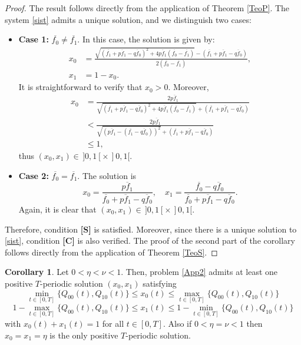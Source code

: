 \documentclass[11pt,reqno]{amsart}
\theoremstyle{definition}
\newtheorem{Corollary}{Corollary}
\begin{document}
\begin{proof}
The result follows directly from the application of Theorem \ref{TeoP}. The system \eqref{sist} admits a unique solution, and we distinguish two cases:
\begin{itemize}
    \item \textbf{Case 1:} $\overline{f_0} \neq \overline{f_1} $. In this case, the solution is given by:
    \begin{align*}
        x_0 &= \frac{\sqrt{(\overline{f_1} + \overline{pf_1} - \overline{qf_0})^2 + 4 \overline{pf_1} (\overline{f_0} - \overline{f_1})} - (\overline{f_1} + \overline{pf_1} - \overline{qf_0})}{2 (\overline{f_0} - \overline{f_1})}, \\
        x_1 &= 1 - x_0.
    \end{align*}
    It is straightforward to verify that $ x_0 > 0$. Moreover,
    \begin{align*}
        x_0 &= \frac{2 \overline{pf_1}}{\sqrt{(\overline{f_1} + \overline{pf_1} - \overline{qf_0})^2 + 4 \overline{pf_1} (\overline{f_0} - \overline{f_1})} + (\overline{f_1} + \overline{pf_1} - \overline{qf_0})} \\
        &< \frac{2 \overline{pf_1}}{\sqrt{(\overline{pf_1} - (\overline{f_1} - \overline{qf_0}))^2} + (\overline{f_1} + \overline{pf_1} - \overline{qf_0})} \\
        &\leq 1,
    \end{align*}
    thus \( (x_0, x_1) \in\, ]0,1[ \times \,]0,1[ \).
    
    \item \textbf{Case 2:} $\overline{f_0} = \overline{f_1}$. The solution is
    $$
        x_0 = \frac{\overline{pf_1}}{\overline{f_0} + \overline{pf_1} - \overline{qf_0}}, \quad x_1 = \frac{\overline{f_0} - \overline{qf_0}}{\overline{f_0} + \overline{pf_1} - \overline{qf_0}}.
    $$
    Again, it is clear that \( (x_0, x_1) \in\, ]0,1[ \times \,]0,1[\).
\end{itemize}
Therefore, condition \textbf{[S]} is satisfied. Moreover,  since there is a unique solution to \eqref{sist}, condition \textbf{[C]}  is also verified.  The proof of the second part of the corollary follows directly from the application of Theorem \ref{TeoS}.
\end{proof}

\begin{Corollary}\label{Teoapp2}  Let $0<\eta<\nu<1$. 
      Then, problem \eqref{App2} admits at least one positive $T$-periodic solution $(x_0,x_1)$ satisfying
 \begin{equation*}
    \min_{t\in[0,T]}\{Q_{00}(t),Q_{10}(t)\}\leq x_0(t)\leq   \max_{t\in[0,T]}\{Q_{00}(t),Q_{10}(t)\} 
\end{equation*}
\begin{equation*}
   1- \max_{t\in[0,T]}\{Q_{00}(t),Q_{10}(t)\} \leq x_1(t)\leq 1- \min_{t\in[0,T]}\{Q_{00}(t),Q_{10}(t)\}  
\end{equation*}
with $x_0(t)+x_1(t)=1$ for all $t\in[0,T]$. Also if $0<\eta=\nu<1$ then $x_0=x_1=\eta$ is the only positive $T$-periodic solution.
\end{Corollary}
\end{document}
